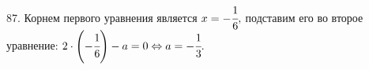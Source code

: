 87. Корнем первого уравнения является $x=-\cfrac{1}{6},$ подставим его во второе уравнение: $2\cdot\left(-\cfrac{1}{6}\right)-a=0\Leftrightarrow
a=-\cfrac{1}{3}.$\\
